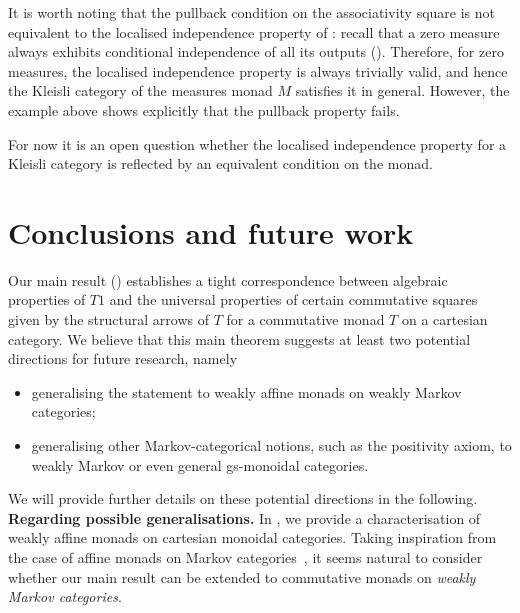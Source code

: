 \documentclass[a4paper,UKenglish,numberwithinsect,cleveref, autoref, thm-restate]{lipics-v2021}
\theoremstyle{plain} %
\theoremstyle{definition} %
\begin{document}
It is worth noting that the pullback condition on the associativity square is not equivalent to the localised independence property of : recall that a zero measure always exhibits conditional independence of all its outputs ().
Therefore, for zero measures, the localised independence property is always trivially valid, and hence the Kleisli category of the measures monad $M$ satisfies it in general.
However, the example above shows explicitly that the pullback property fails.

For now it is an open question whether the localised independence property for a Kleisli category is reflected by an equivalent condition on the monad.


\section{Conclusions and future work}
\label{secfurther}


Our main result () establishes a tight correspondence between algebraic properties of $T1$ and the universal properties of certain commutative squares given by the structural arrows of $T$ for a commutative monad $T$ on a cartesian category.
We believe that this main theorem suggests at least two potential directions for future research, namely
\begin{itemize}
\item generalising the statement to weakly affine monads on weakly Markov categories;
\item generalising other Markov-categorical notions, such as the positivity axiom, to weakly Markov or even general gs-monoidal categories.
\end{itemize} 
We will provide further details on these potential directions in the following.
\\

\textbf{Regarding possible generalisations.} In , we provide a characterisation of weakly affine monads on cartesian monoidal categories. Taking inspiration from the case of affine monads on Markov categories~\cite[Corollary~3.2]{Fritz_2020}, it seems natural to consider whether our main result can be extended to commutative monads on \emph{weakly Markov categories}.
\end{document}
